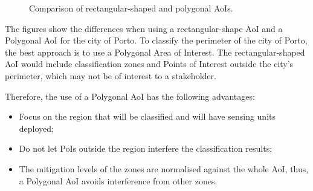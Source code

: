 \begin{refsection}
\begin{figure}[!ht]
  \centering
  \hspace{0.5in}
  \caption{Comparison of rectangular-shaped and polygonal AoIs.}\label{fig:square_polygonal_aois}
\end{figure}

The figures show the differences when using a rectangular-shape AoI and a Polygonal AoI for the city of Porto. To classify the perimeter of the city of Porto, the best approach is to use a Polygonal Area of Interest. The rectangular-shaped AoI would include classification zones and Points of Interest outside the city's perimeter, which may not be of interest to a stakeholder.

Therefore, the use of a Polygonal AoI has the following advantages:

\begin{itemize}
  \item Focus on the region that will be classified and will have sensing units deployed;
  \item Do not let PoIs outside the region interfere the classification results;
  \item The mitigation levels of the zones are normalised against the whole AoI, thus, a Polygonal AoI avoids interference from other zones.
\end{itemize}


\end{refsection}
